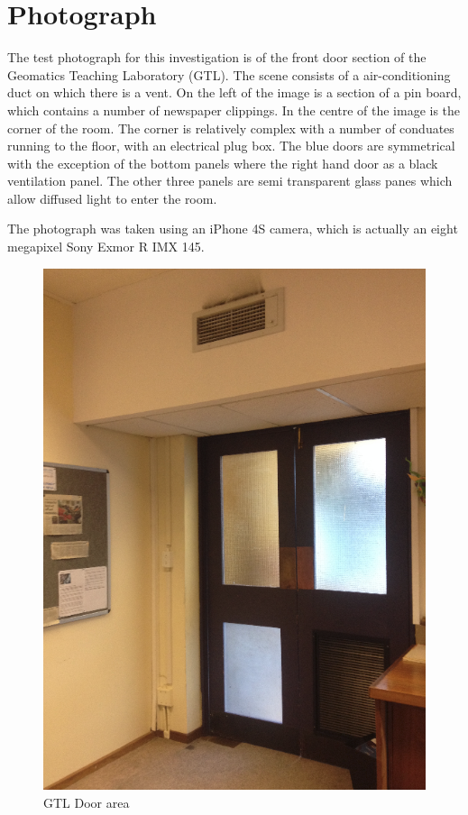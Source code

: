 \documentclass[11pt,a4paper]{report}
\begin{document}
	\section{Photograph}
		The test photograph for this investigation is of the front door section of the Geomatics Teaching Laboratory (GTL). The scene consists of a air-conditioning duct on which there is a vent. On the left of the image is a section of a pin board, which contains a number of newspaper clippings. In the centre of the image is the corner of the room. The corner is relatively complex with a number of conduates running to the floor, with an electrical plug box. The blue doors are symmetrical with the exception of the bottom panels where the right hand door as a black ventilation panel. The other three panels are semi transparent glass panes which allow diffused light to enter the room.
		
		The photograph was taken using an iPhone 4S camera, which is actually an eight megapixel Sony Exmor R IMX 145.
		
		\begin{figure}[H]
			\centering
			\includegraphics[width=1\textwidth]{gtl_door_area}
			\caption{GTL Door area}
		\end{figure}
		
\end{document}
